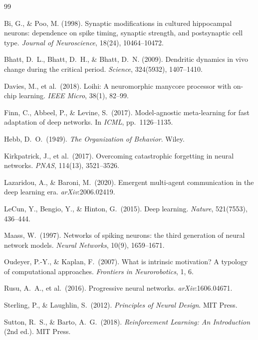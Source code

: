 \documentclass[10pt,twocolumn]{article}
\begin{document}
\begin{thebibliography}{99}

Bi, G., \& Poo, M. (1998).
Synaptic modifications in cultured hippocampal neurons: dependence on spike
timing, synaptic strength, and postsynaptic cell type.
\textit{Journal of Neuroscience}, 18(24), 10464--10472.

Bhatt, D.\ L., Bhatt, D.\ H., \& Bhatt, D.\ N. (2009).
Dendritic dynamics in vivo change during the critical period.
\textit{Science}, 324(5932), 1407--1410.

Davies, M., et al.\ (2018).
Loihi: A neuromorphic manycore processor with on-chip learning.
\textit{IEEE Micro}, 38(1), 82--99.

Finn, C., Abbeel, P., \& Levine, S.\ (2017).
Model-agnostic meta-learning for fast adaptation of deep networks.
In \textit{ICML}, pp.\ 1126--1135.

Hebb, D.\ O.\ (1949).
\textit{The Organization of Behavior}.
Wiley.

Kirkpatrick, J., et al.\ (2017).
Overcoming catastrophic forgetting in neural networks.
\textit{PNAS}, 114(13), 3521--3526.

Lazaridou, A., \& Baroni, M.\ (2020).
Emergent multi-agent communication in the deep learning era.
\textit{arXiv}:2006.02419.

LeCun, Y., Bengio, Y., \& Hinton, G.\ (2015).
Deep learning.
\textit{Nature}, 521(7553), 436--444.

Maass, W.\ (1997).
Networks of spiking neurons: the third generation of neural network models.
\textit{Neural Networks}, 10(9), 1659--1671.

Oudeyer, P.-Y., \& Kaplan, F.\ (2007).
What is intrinsic motivation? A typology of computational approaches.
\textit{Frontiers in Neurorobotics}, 1, 6.

Rusu, A.\ A., et al.\ (2016).
Progressive neural networks.
\textit{arXiv}:1606.04671.

Sterling, P., \& Laughlin, S.\ (2012).
\textit{Principles of Neural Design}.
MIT Press.

Sutton, R.\ S., \& Barto, A.\ G.\ (2018).
\textit{Reinforcement Learning: An Introduction} (2nd ed.).
MIT Press.

\end{thebibliography}
\end{document}

